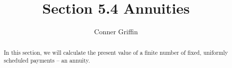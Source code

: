 \documentclass{ximera}
\title{Section 5.4 Annuities}
\author{Conner Griffin}
\begin{document}
\begin{abstract}
    In this section, we will calculate the present value of a finite number of fixed, uniformly scheduled payments -- an annuity.
\end{abstract}
\maketitle






\end{document}
